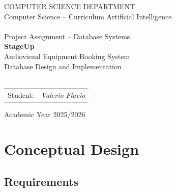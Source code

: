 \documentclass[12pt]{article}
\begin{document}

\begin{titlepage}
  \begin{center}
    \vspace*{1cm}
    {\large COMPUTER SCIENCE DEPARTMENT}\\[0.4cm]
    {\large Computer Science -- Curriculum Artificial Intelligence}\\[0.3cm]
    \hrulefill\\[0.4cm]
    {\large Project Assignment -- Database Systems}\\[0.6cm]
    {\LARGE \textbf{StageUp}}\\[0.2cm]
    {\Large Audiovisual Equipment Booking System}\\[0.3cm]
    {\large Database Design and Implementation}\\[1cm]
    \hrulefill\\[0.5cm]
    \begin{tabularx}{\textwidth}{@{}Xr@{}}
      {\large Student:} & {\large \textit{Valerio Flavio}} \\
    \end{tabularx}
    \vfill
    {\large Academic Year 2025/2026}
  \end{center}
\end{titlepage}

\tableofcontents
\newpage

\section{Conceptual Design}

\subsection{Requirements}
\end{document}
